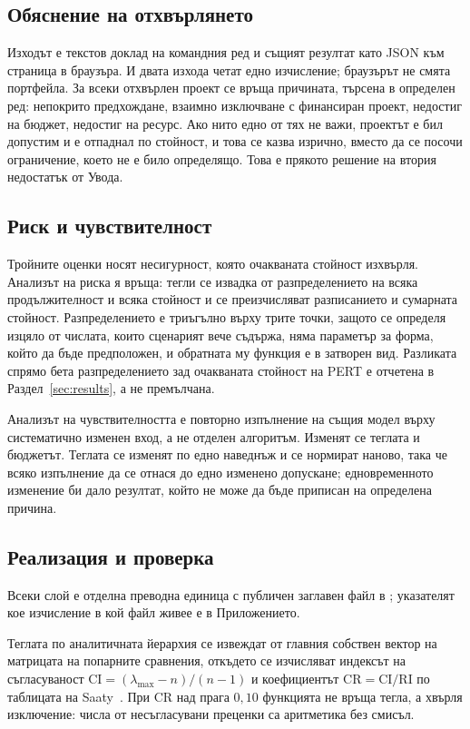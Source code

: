\subsection{Обяснение на отхвърлянето}

Изходът е текстов доклад на командния ред и същият резултат като JSON към
страница в браузъра. И двата изхода четат едно изчисление; браузърът не смята
портфейла. За всеки отхвърлен проект се връща причината, търсена в определен ред:
непокрито предхождане, взаимно изключване с финансиран проект, недостиг на бюджет,
недостиг на ресурс. Ако нито едно от тях не важи, проектът е бил допустим и е
отпаднал по стойност, и това се казва изрично, вместо да се посочи ограничение,
което не е било определящо. Това е прякото решение на втория недостатък от Увода.

\subsection{Риск и чувствителност}

Тройните оценки носят несигурност, която очакваната стойност изхвърля. Анализът
на риска я връща: тегли се извадка от разпределението на всяка продължителност и
всяка стойност и се преизчисляват разписанието и сумарната стойност.
Разпределението е триъгълно върху трите точки, защото се определя изцяло от
числата, които сценарият вече съдържа, няма параметър за форма, който да бъде
предположен, и обратната му функция е в затворен вид. Разликата спрямо бета
разпределението зад очакваната стойност на PERT е отчетена в
Раздел~\ref{sec:results}, а не премълчана.

Анализът на чувствителността е повторно изпълнение на същия модел върху
систематично изменен вход, а не отделен алгоритъм. Изменят се теглата и бюджетът.
Теглата се изменят по едно наведнъж и се нормират наново, така че всяко
изпълнение да се отнася до едно изменено допускане; едновременното изменение би
дало резултат, който не може да бъде приписан на определена причина.

\subsection{Реализация и проверка}

Всеки слой е отделна преводна единица с публичен заглавен файл в
; указателят кое изчисление в кой файл живее е в
Приложението.

Теглата по аналитичната йерархия се извеждат от главния собствен вектор на
матрицата на попарните сравнения, откъдето се изчисляват индексът на съгласуваност
$\mathrm{CI} = (\lambda_{\max} - n)/(n-1)$ и коефициентът
$\mathrm{CR} = \mathrm{CI}/\mathrm{RI}$ по таблицата на Saaty~\cite{saaty1980ahp}.
При $\mathrm{CR}$ над прага $0{,}10$ функцията не връща тегла, а хвърля изключение:
числа от несъгласувани преценки са аритметика без смисъл.

